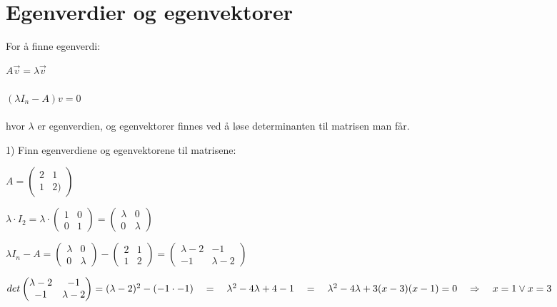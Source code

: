 \documentclass{article}
\begin{document}
\newpage
\section*{Egenverdier og egenvektorer}

For å finne egenverdi:

$A\vec{v} = \lambda \vec{v}$ \\\\
$(\lambda I_n - A)v = 0$ \\
\\ 
hvor $\lambda$ er egenverdien, og egenvektorer finnes ved å løse determinanten til matrisen man får.

1) Finn egenverdiene og egenvektorene til matrisene:

\(A = \begin{pmatrix}
    2 & 1 \\ 1 & 2)
\end{pmatrix}\)

\(\lambda \cdot I_2 = \lambda \cdot \begin{pmatrix}
1 & 0 \\ 0 & 1
\end{pmatrix} = \begin{pmatrix}
    \lambda & 0 \\ 0 & \lambda
\end{pmatrix}\)

\(\lambda I_n - A = \begin{pmatrix}
    \lambda & 0 \\ 0 & \lambda 
\end{pmatrix} - \begin{pmatrix}
    2 & 1 \\ 1 & 2
\end{pmatrix} = \begin{pmatrix}
    \lambda - 2 & -1 \\ -1 & \lambda - 2
\end{pmatrix}\)

\(det\begin{pmatrix}
    \lambda - 2 & -1 \\ -1 & \lambda -2
\end{pmatrix} = (\lambda - 2)^2 - (-1 \cdot -1) \quad = \quad \lambda^2 - 4\lambda + 4 - 1 \quad = \quad \lambda ^2 - 4\lambda + 3 \\ \\ \\ (x-3)(x-1) = 0 \quad \Rightarrow \quad x = 1 \vee x = 3\)

\hfill
\end{document}
